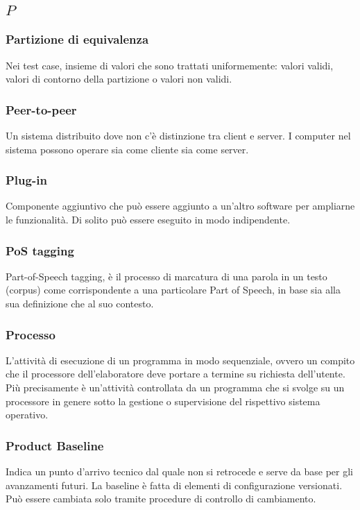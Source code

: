 \subsection*{\quad$P\quad$}
\subsubsection*{Partizione di equivalenza}
Nei test case, insieme di valori che sono trattati uniformemente: valori validi, valori di contorno della partizione o valori non validi.

\subsubsection*{Peer-to-peer}
Un sistema distribuito dove non c'è distinzione tra client e server. I computer nel sistema possono operare sia come cliente sia come server. 

\subsubsection*{Plug-in}
Componente aggiuntivo che può essere aggiunto a un'altro software per ampliarne le funzionalità. Di solito può essere eseguito in modo indipendente.

\subsubsection*{PoS tagging}
Part-of-Speech tagging, è il processo di marcatura di una parola in un testo (corpus) come corrispondente a una particolare Part of Speech\glosp , in base sia alla sua definizione che al suo contesto.

\subsubsection*{Processo}
L'attività di esecuzione di un programma in modo sequenziale, ovvero un compito che il processore dell'elaboratore deve portare a termine su richiesta dell'utente. Più precisamente è un'attività controllata da un programma che si svolge su un processore in genere sotto la gestione o supervisione del rispettivo sistema operativo.

\subsubsection*{Product Baseline}
Indica un punto d’arrivo tecnico dal quale non si retrocede e serve da base per gli avanzamenti futuri. La baseline è fatta di elementi di configurazione versionati. Può essere cambiata solo tramite procedure di controllo di cambiamento.

